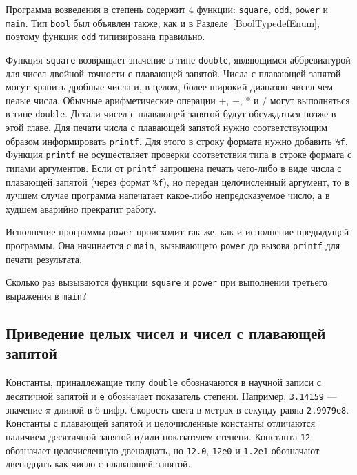Программа возведения в степень содержит 4 функции: \lstinline|square|, \lstinline|odd|, \lstinline|power| и \lstinline|main|. Тип \lstinline|bool| был объявлен также, как и в Разделе~\ref{BoolTypedefEnum}, поэтому функция \lstinline|odd| типизирована правильно.

Функция \lstinline|square| возвращает значение в типе \lstinline|double|, являющимся аббревиатурой для чисел двойной точности с плавающей запятой. Числа с плавающей запятой могут хранить дробные числа и, в целом, более широкий диапазон чисел чем целые числа. Обычные арифметические операции $+$, $-$, $*$ и $/$ могут выполняться в типе \lstinline|double|. Детали чисел с плавающей запятой будут обсуждаться позже в этой главе. Для печати числа с плавающей запятой нужно соответствующим образом информировать \lstinline|printf|. Для этого в строку формата нужно добавить \lstinline|%f|. Функция \lstinline|printf| не осуществляет проверки соответствия типа в строке формата с типами аргументов. Если от \lstinline|printf| запрошена печать чего-либо в виде числа с плавающей запятой (через формат \lstinline|%f|), но передан целочисленный аргумент, то в лучшем случае программа напечатает какое-либо непредсказуемое число, а в худшем аварийно прекратит работу.

Исполнение программы \lstinline|power| происходит так же, как и исполнение предыдущей программы. Она начинается с \lstinline|main|, вызывающего \lstinline|power| до вызова \lstinline|printf| для печати результата.

\exercise Сколько раз вызываются функции \lstinline|square| и \lstinline|power| при выполнении третьего выражения в \lstinline|main|?\label{ex_2.8}

\subsection{Приведение целых чисел и чисел с плавающей запятой}\label{coercionsIntegerFloating}

Константы, принадлежащие типу \lstinline|double| обозначаются в научной записи с десятичной запятой и \lstinline|e| обозначает показатель степени. Например, \lstinline|3.14159| --- значение $\pi$ длиной в 6 цифр. Скорость света в метрах в секунду равна \lstinline|2.9979e8|. Константы с плавающей запятой и целочисленные константы отличаются наличием десятичной запятой и/или показателем степени. Константа \lstinline|12| обозначает целочисленную двенадцать, но \lstinline|12.0|, \lstinline|12e0| и \lstinline|1.2e1| обозначают двенадцать как число с плавающей запятой.

